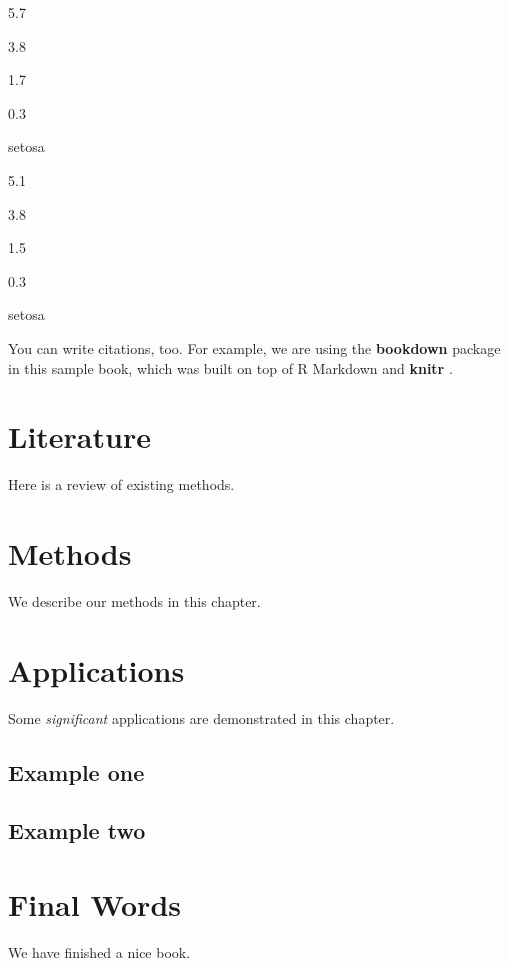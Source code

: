 \documentclass[
]{book}
\begin{document}
5.7

3.8

1.7

0.3

setosa

5.1

3.8

1.5

0.3

setosa

You can write citations, too. For example, we are using the \textbf{bookdown} package \citep{R-bookdown} in this sample book, which was built on top of R Markdown and \textbf{knitr} \citep{xie2015}.

\hypertarget{literature}{%
\chapter{Literature}\label{literature}}

Here is a review of existing methods.

\hypertarget{methods}{%
\chapter{Methods}\label{methods}}

We describe our methods in this chapter.

\hypertarget{applications}{%
\chapter{Applications}\label{applications}}

Some \emph{significant} applications are demonstrated in this chapter.

\hypertarget{example-one}{%
\section{Example one}\label{example-one}}

\hypertarget{example-two}{%
\section{Example two}\label{example-two}}

\hypertarget{final-words}{%
\chapter{Final Words}\label{final-words}}

We have finished a nice book.
\end{document}
